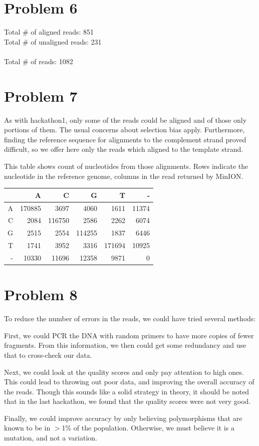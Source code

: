 \documentclass[11pt]{article}
\begin{document}
\section*{Problem 6}
Total \# of aligned reads: 851\\
Total \# of unaligned reads: 231\\
\\
Total \# of reads: 1082\\
\section*{Problem 7}
As with hackathon1, only some of the reads could be aligned and of those only portions of them.  The usual concerns about selection bias apply.  Furthermore, finding the reference sequence for alignments to the complement strand proved difficult, so we offer here only the reads which aligned to the template strand.

This table shows count of nucleotides from those alignments.  Rows indicate the nucleotide in the reference genome, columns in the read returned by MinION.


\begin{tabular}{r||r|r|r|r|r}
  & A & C & G & T & -\\ \hline
\hline
A & 170885 & 3697 & 4060 & 1611 & 11374\\ 
\hline
C & 2084 & 116750 & 2586 & 2262 & 6074\\ 
\hline
G & 2515 & 2554 & 114255 & 1837 & 6446\\ 
\hline
T & 1741 & 3952 & 3316 & 171694 & 10925\\ 
\hline
- & 10330 & 11696 & 12358 & 9871 & 0\\ 
\end{tabular}
\section*{Problem 8}
To reduce the number of errors in the reads, we could have tried several methods:

First, we could PCR the DNA with random primers to have more copies of
fewer fragments. From this information, we then could get some redundancy and 
use that to cross-check our data.

Next, we could look at the quality scores and only pay attention to high ones.
This could lead to throwing out poor data, and improving the overall accuracy
of the reads. Though this sounds like a solid strategy in theory, it should be
noted that in the last hackathon, we found that the quality scores were not
very good.

Finally, we could improve accuracy by only believing polymorphisms that are known 
to be in $>$1\% of the population. Otherwise, we must believe it is a mutation, and
not a variation. 
\end{document}

